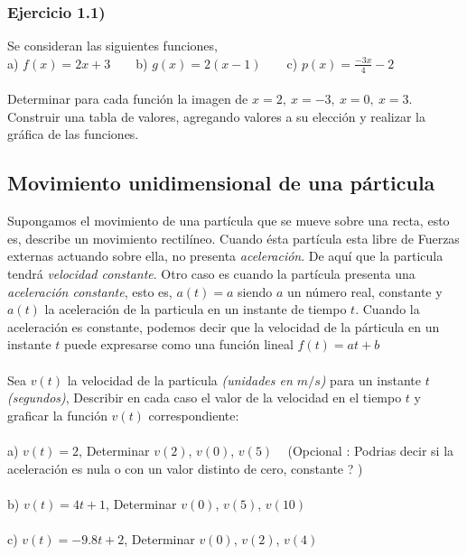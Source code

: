 \documentclass[11pt, a4paper]{article}
\begin{document}
\subsubsection*{ Ejercicio 1.1) } 
Se consideran las siguientes funciones, \\
a) $ f(x) = 2x + 3 $ ~ ~ b) $\displaystyle  g(x) = 2(x-1) $ ~ ~ c) $\displaystyle p(x) = \frac{-3x}{4} - 2 $ \\ \\
Determinar para cada funci\'on la imagen de $x=2,~x=-3,~ x=0,~x=3$. \\ Construir una tabla de valores, agregando valores a su elecci\'on y realizar la gr\'afica de las funciones. 
\subsection{ Movimiento unidimensional de una p\'articula}
Supongamos el movimiento de una part\'icula que se mueve sobre una recta, esto es, describe un movimiento rectil\'ineo. Cuando \'esta part\'icula esta libre de Fuerzas externas actuando sobre ella, no presenta \textit{aceleraci\'on}. De aqu\'i que la particula tendr\'a \textit{velocidad constante}. Otro caso es cuando la part\'icula presenta una \textit{aceleraci\'on constante}, esto es, $a(t) = a$ siendo $a$ un n\'umero real, constante y $a(t)$ la aceleraci\'on de la particula en un instante de tiempo $t$. Cuando la aceleraci\'on es constante, podemos decir que la velocidad de la p\'articula en un instante $t$ puede expresarse como una funci\'on lineal $f(t) = at + b$ \\ \\ 
Sea {\color{blue} $v(t)$ }la velocidad de la particula \textit{(unidades en $m/s$)} para un instante $t$ \textit{(segundos)}, Describir en cada caso el valor de la velocidad en el tiempo $t$ y graficar la funci\'on $v(t)$ correspondiente: \\ \\ 
a) {\color{blue}$v(t) = 2 $},  Determinar $v(2)$, $v(0)$, $v(5)$ ~ (Opcional : Podrias decir si la aceleraci\'on es nula o con un valor distinto de cero, constante ? )  \\ \\ 
b) {\color{blue}$v(t) = 4t + 1$}, Determinar $v(0)$, $v(5)$, $v(10)$ \\ \\ 
c) {\color{blue}$v(t) = -9.8t + 2$}, Determinar $v(0)$, $v(2)$, $v(4)$ \\ \\ 
\end{document}
